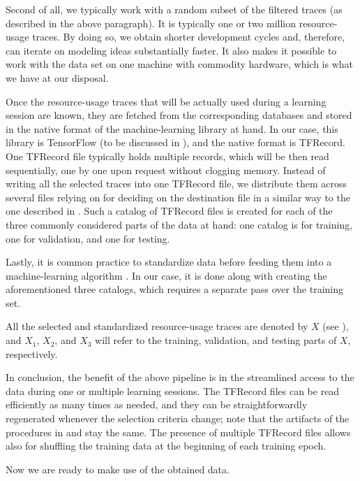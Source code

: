 Second of all, we typically work with a random subset of the filtered traces (as
described in the above paragraph). It is typically one or two million
resource-usage traces. By doing so, we obtain shorter development cycles and,
therefore, can iterate on modeling ideas substantially faster. It also makes it
possible to work with the data set on one machine with commodity hardware, which
is what we have at our disposal.

Once the resource-usage traces that will be actually used during a learning
session are known, they are fetched from the corresponding databases and stored
in the native format of the machine-learning library at hand. In our case, this
library is TensorFlow \cite{abadi2015} (to be discussed in ), and
the native format is TFRecord. One TFRecord file typically holds multiple
records, which will be then read sequentially, one by one upon request without
clogging memory. Instead of writing all the selected traces into one TFRecord
file, we distribute them across several files relying on  for deciding
on the destination file in a similar way to the one described in
. Such a catalog of TFRecord files is created for each of the
three commonly considered parts \cite{hastie2009} of the data at hand: one
catalog is for training, one for validation, and one for testing.

Lastly, it is common practice to standardize data before feeding them into a
machine-learning algorithm \cite{hastie2009}. In our case, it is done along with
creating the aforementioned three catalogs, which requires a separate pass over
the training set.

All the selected and standardized resource-usage traces are denoted by $X$ (see
), and $X_1$, $X_2$, and $X_3$ will refer to the training,
validation, and testing parts of $X$, respectively.

In conclusion, the benefit of the above pipeline is in the streamlined access to
the data during one or multiple learning sessions. The TFRecord files can be
read efficiently as many times as needed, and they can be straightforwardly
regenerated whenever the selection criteria change; note that the artifacts of
the procedures in  and  stay the same. The
presence of multiple TFRecord files allows also for shuffling the training data
at the beginning of each training epoch.

Now we are ready to make use of the obtained data.
